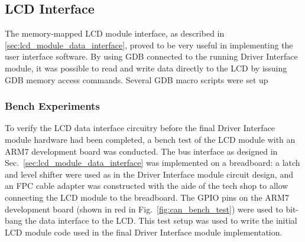 



\subsection{LCD Interface}

The memory-mapped LCD module interface, as described in \ref{sec:lcd_module_data_interface}, proved to be very useful in implementing the user interface software. By using GDB connected to the running Driver Interface module, it was possible to read and write data directly to the LCD by issuing GDB memory access commands. Several GDB macro scripts were set up

\subsubsection{Bench Experiments}

To verify the LCD data interface circuitry before the final Driver Interface module hardware had been completed, a bench test of the LCD module with an ARM7 development board was conducted. The bus interface as designed in Sec.\ \ref{sec:lcd_module_data_interface} was implemented on a breadboard: a latch and level shifter were used as in the Driver Interface module circuit design, and an FPC cable adapter was constructed with the aide of the tech shop to allow connecting the LCD module to the breadboard. The GPIO pins on the ARM7 development board (shown in red in Fig.\ \ref{fig:can_bench_test}) were used to bit-bang the data interface to the LCD. This test setup was used to write the initial LCD module code used in the final Driver Interface module implementation.

